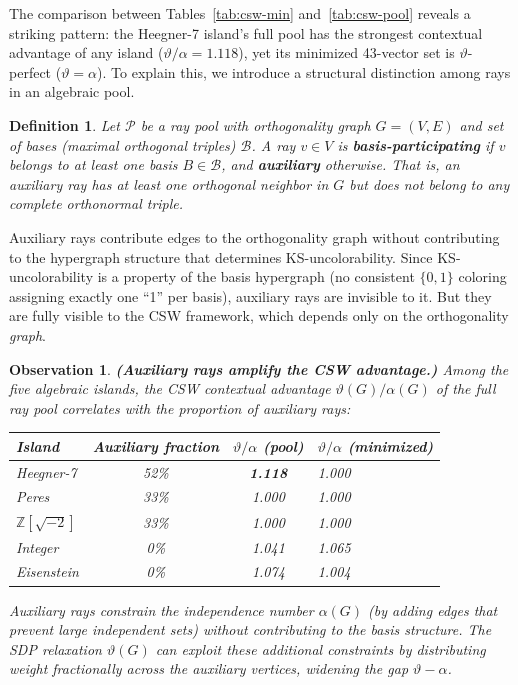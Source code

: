 \documentclass[12pt,a4paper]{article}
\newtheorem{definition}[theorem]{Definition}
\newtheorem{observation}[theorem]{Observation}
\newcommand{\Z}{\mathbb{Z}}
\begin{document}
The comparison between Tables~\ref{tab:csw-min} and~\ref{tab:csw-pool} reveals a striking pattern: the Heegner-7 island's full pool has the strongest contextual advantage of any island ($\vartheta/\alpha = 1.118$), yet its minimized 43-vector set is $\vartheta$-perfect ($\vartheta = \alpha$). To explain this, we introduce a structural distinction among rays in an algebraic pool.

\begin{definition}\label{def:auxiliary}
Let $\mathcal{P}$ be a ray pool with orthogonality graph $G = (V, E)$ and set of bases (maximal orthogonal triples) $\mathcal{B}$. A ray $v \in V$ is \textbf{basis-participating} if $v$ belongs to at least one basis $B \in \mathcal{B}$, and \textbf{auxiliary} otherwise. That is, an auxiliary ray has at least one orthogonal neighbor in $G$ but does not belong to any complete orthonormal triple.
\end{definition}

Auxiliary rays contribute edges to the orthogonality graph without contributing to the hypergraph structure that determines KS-uncolorability. Since KS-uncolorability is a property of the basis hypergraph (no consistent $\{0,1\}$ coloring assigning exactly one ``1'' per basis), auxiliary rays are invisible to it. But they are fully visible to the CSW framework, which depends only on the orthogonality \emph{graph}.

\begin{observation}\label{obs:auxiliary}
\textbf{(Auxiliary rays amplify the CSW advantage.)} Among the five algebraic islands, the CSW contextual advantage $\vartheta(G)/\alpha(G)$ of the full ray pool correlates with the proportion of auxiliary rays:
\begin{center}
\begin{tabular}{lccl}
\toprule
Island & Auxiliary fraction & $\vartheta/\alpha$ (pool) & $\vartheta/\alpha$ (minimized) \\
\midrule
Heegner-7 & 52\% & \textbf{1.118} & 1.000 \\
Peres & 33\% & 1.000 & 1.000 \\
$\Z[\sqrt{-2}]$ & 33\% & 1.000 & 1.000 \\
Integer & 0\% & 1.041 & 1.065 \\
Eisenstein & 0\% & 1.074 & 1.004 \\
\bottomrule
\end{tabular}
\end{center}
Auxiliary rays constrain the independence number $\alpha(G)$ (by adding edges that prevent large independent sets) without contributing to the basis structure. The SDP relaxation $\vartheta(G)$ can exploit these additional constraints by distributing weight fractionally across the auxiliary vertices, widening the gap $\vartheta - \alpha$.
\end{observation}
\end{document}
